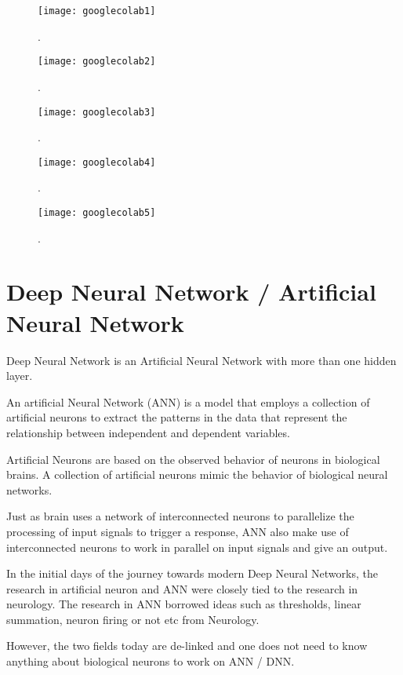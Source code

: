 	\begin{figure}[h]
		\centering
		\texttt{[image: googlecolab1]}
		\caption{.}
		\label{fig:googlecolab1}
	\end{figure}

	\begin{figure}[h]
		\centering
		\texttt{[image: googlecolab2]}
		\caption{.}
		\label{fig:googlecolab2}
	\end{figure}

	\begin{figure}[h]
		\centering
		\texttt{[image: googlecolab3]}
		\caption{.}
		\label{fig:googlecolab3}
	\end{figure}

 	\begin{figure}[h]
		\centering
		\texttt{[image: googlecolab4]}
		\caption{.}
		\label{fig:googlecolab4}
	\end{figure}
\clearpage{}

 	\begin{figure}[h]
		\centering
		\texttt{[image: googlecolab5]}
		\caption{.}
		\label{fig:googlecolab5}
	\end{figure}


	\section{Deep Neural Network / Artificial Neural Network}

	\begin{bulletedlist}
		\item Deep Neural Network is an Artificial Neural Network with more than one hidden layer.
		\item An artificial Neural Network (ANN) is a model that employs a collection of artificial neurons to extract the patterns in the data that represent the relationship between independent and dependent variables.
		\item Artificial Neurons are based on the observed behavior of neurons in biological brains. A collection of artificial neurons mimic the behavior of biological neural networks.
		\item Just as brain uses a network of interconnected neurons to parallelize the processing of input signals to trigger a response, ANN also make use of interconnected neurons to work in parallel on input signals and give an output.
		\item In the initial days of the journey towards modern Deep Neural Networks, the research in artificial neuron and ANN were closely tied to the research in
neurology. The research in ANN borrowed ideas such as thresholds, linear summation, neuron firing or not etc from Neurology.
		\item However, the two fields today are de-linked and one does not need to know anything about biological neurons to work on ANN / DNN.
	\end{bulletedlist}

